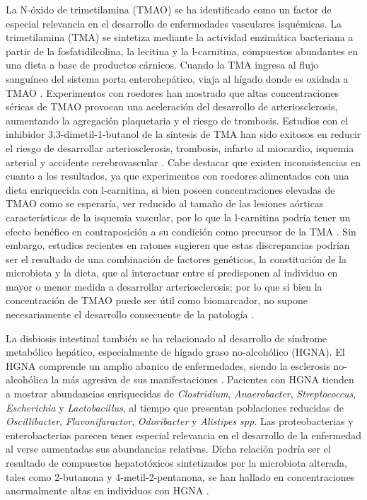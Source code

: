 \documentclass[
]{book}
\begin{document}
La N-óxido de trimetilamina (TMAO) se ha identificado como un factor de especial relevancia en el desarrollo de enfermedades vasculares isquémicas. La trimetilamina (TMA) se sintetiza mediante la actividad enzimática bacteriana a partir de la fosfatidilcolina, la lecitina y la l-carnitina, compuestos abundantes en una dieta a base de productos cárnicos. Cuando la TMA ingresa al flujo sanguíneo del sistema porta enterohepático, viaja al hígado donde es oxidada a TMAO \citep{zhu2016gut}. Experimentos con roedores han mostrado que altas concentraciones séricas de TMAO provocan una aceleración del desarrollo de arteriosclerosis, aumentando la agregación plaquetaria y el riesgo de trombosis. Estudios con el inhibidor 3,3-dimetil-1-butanol de la síntesis de TMA han sido exitosos en reducir el riesgo de desarrollar arteriosclerosis, trombosis, infarto al miocardio, isquemia arterial y accidente cerebrovascular \citep{senthong2016intestinal}. Cabe destacar que existen inconsistencias en cuanto a los resultados, ya que experimentos con roedores alimentados con una dieta enriquecida con l-carnitina, si bien poseen concentraciones elevadas de TMAO como se esperaría, ver reducido al tamaño de las lesiones aórticas características de la isquemia vascular, por lo que la l-carnitina podría tener un efecto benéfico en contraposición a su condición como precursor de la TMA \citep{collins2016carnitine}. Sin embargo, estudios recientes en ratones sugieren que estas discrepancias podrían ser el resultado de una combinación de factores genéticos, la constitución de la microbiota y la dieta, que al interactuar entre sí predisponen al individuo en mayor o menor medida a desarrollar arteriosclerosis; por lo que si bien la concentración de TMAO puede ser útil como biomarcador, no supone necesariamente el desarrollo consecuente de la patología \citep{fan2021gut}.

La disbiosis intestinal también se ha relacionado al desarrollo de síndrome metabólico hepático, especialmente de hígado graso no-alcohólico (HGNA). El HGNA comprende un amplio abanico de enfermedades, siendo la esclerosis no-alcohólica la más agresiva de sus manifestaciones \citep{collins2016carnitine}. Pacientes con HGNA tienden a mostrar abundancias enriquecidas de \emph{Clostridium}, \emph{Anaerobacter}, \emph{Streptococcus}, \emph{Escherichia} y \emph{Lactobacillus}, al tiempo que presentan poblaciones reducidas de \emph{Oscillibacter}, \emph{Flavonifaractor}, \emph{Odoribacter} y \emph{Alistipes spp.} Las proteobacterias y enterobacterias parecen tener especial relevancia en el desarrollo de la enfermedad al verse aumentadas sus abundancias relativas. Dicha relación podría ser el resultado de compuestos hepatotóxicos sintetizados por la microbiota alterada, tales como 2-butanona y 4-metil-2-pentanona, se han hallado en concentraciones anormalmente altas en individuos con HGNA \citep{del2017gut}.
\end{document}
